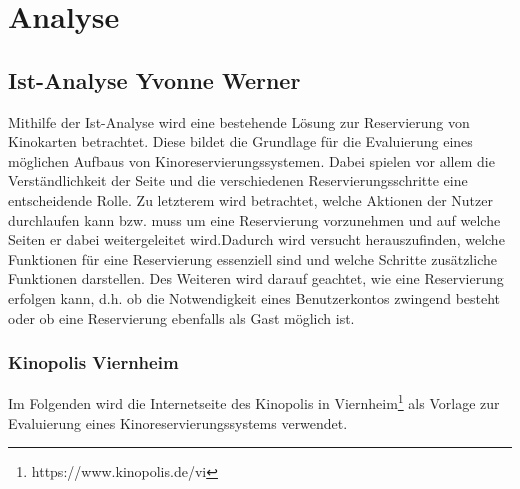 \chapter{Analyse} \label{analyse}
	
	\section[Ist-Analyse]{Ist-Analyse {\hfill \normalsize Yvonne Werner}}\label{istAnalyse}
	Mithilfe der Ist-Analyse wird eine bestehende Lösung zur Reservierung von Kinokarten betrachtet. Diese bildet die Grundlage für die Evaluierung eines möglichen Aufbaus von Kinoreservierungssystemen. Dabei spielen vor allem die Verständlichkeit der Seite und die verschiedenen Reservierungsschritte eine entscheidende Rolle. Zu letzterem wird betrachtet, welche Aktionen der Nutzer durchlaufen kann bzw. muss um eine Reservierung vorzunehmen und auf welche Seiten er dabei weitergeleitet wird.Dadurch wird versucht herauszufinden, welche Funktionen für eine Reservierung essenziell sind und welche Schritte zusätzliche Funktionen darstellen. Des Weiteren wird darauf geachtet, wie eine Reservierung erfolgen kann, d.h. ob die Notwendigkeit eines Benutzerkontos zwingend besteht oder ob eine Reservierung ebenfalls als Gast möglich ist. 
	
	\subsection{Kinopolis Viernheim}
	Im Folgenden wird die Internetseite des Kinopolis in Viernheim\footnote{https://www.kinopolis.de/vi} als Vorlage zur Evaluierung eines Kinoreservierungssystems verwendet. 
	
